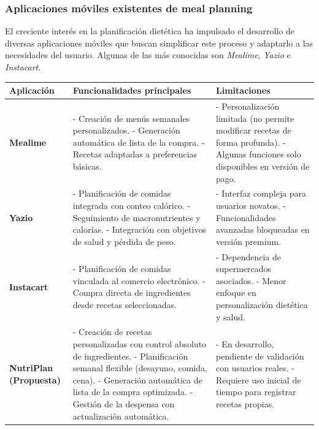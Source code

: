 \documentclass[12pt,a4paper]{report} %
\begin{document}
	
	\subsubsection*{Aplicaciones móviles existentes de meal planning}
	El creciente interés en la planificación dietética ha impulsado el desarrollo de diversas aplicaciones móviles que buscan simplificar este proceso y adaptarlo a las necesidades del usuario. Algunas de las más conocidas son \textit{Mealime}, \textit{Yazio} e \textit{Instacart}.\\
	
	\begin{table}[H]
		\centering

		\begin{tabular}{|p{3cm}|p{5cm}|p{5cm}|}
			\hline
			\textbf{Aplicación} & \textbf{Funcionalidades principales} & \textbf{Limitaciones} \\ \hline
			
			\textbf{Mealime} & 
			- Creación de menús semanales personalizados. \newline
			- Generación automática de lista de la compra. \newline
			- Recetas adaptadas a preferencias básicas. & 
			- Personalización limitada (no permite modificar recetas de forma profunda). \newline
			- Algunas funciones solo disponibles en versión de pago. \\ \hline
			
			\textbf{Yazio} & 
			- Planificación de comidas integrada con conteo calórico. \newline
			- Seguimiento de macronutrientes y calorías. \newline
			- Integración con objetivos de salud y pérdida de peso. & 
			- Interfaz compleja para usuarios novatos. \newline
			- Funcionalidades avanzadas bloqueadas en versión premium. \\ \hline
			
			\textbf{Instacart} & 
			- Planificación de comidas vinculada al comercio electrónico. \newline
			- Compra directa de ingredientes desde recetas seleccionadas. & 
			- Dependencia de supermercados asociados. \newline
			- Menor enfoque en personalización dietética y salud. \\ \hline
			
			\textbf{NutriPlan (Propuesta)} & 
			- Creación de recetas personalizadas con control absoluto de ingredientes. \newline
			- Planificación semanal flexible (desayuno, comida, cena). \newline
			- Generación automática de lista de la compra optimizada. \newline
			- Gestión de la despensa con actualización automática. & 
			- En desarrollo, pendiente de validación con usuarios reales. \newline
			- Requiere uso inicial de tiempo para registrar recetas propias. \\ \hline


\end{tabular}
\end{table}
\end{document}
